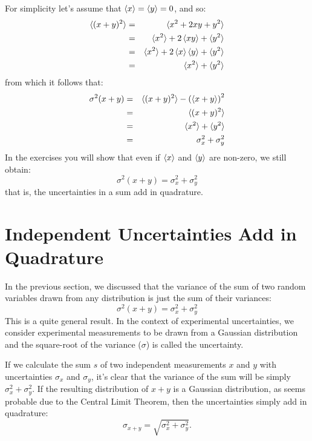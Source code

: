 \documentclass[12pt,oneside]{book}
\begin{document}
For simplicity let's assume that $\braket{x} = \braket{y} = 0$, and so:
\begin{eqnarray*}
\braket{(x + y)^2} &=& \braket{x^2 + 2xy + y^2} \\
&=& \braket{x^2} + 2\braket{xy} + \braket{y^2} \\
&=& \braket{x^2} + 2\braket{x}\braket{y} + \braket{y^2} \\
&=& \braket{x^2} + \braket{y^2} \\
\end{eqnarray*}
from which it follows that:
\begin{eqnarray*}
\sigma^2(x+y) &=& \braket{(x+y)^2} - \left( \braket{x+y} \right) ^2\\
&=& \braket{(x+y)^2}\\
&=& \braket{x^2} + \braket{y^2} \\
&=& \sigma^2_x + \sigma^2_y\\
\end{eqnarray*}
In the exercises you will show that even if $\braket{x}$ and $\braket{y}$ are non-zero, we still obtain:
\begin{displaymath}
\sigma^2(x+y) = \sigma^2_x + \sigma^2_y
\end{displaymath}
that is, the uncertainties in a sum add in quadrature.

\section{Independent Uncertainties Add in Quadrature}

In the previous section, we discussed that the variance of the sum of two random variables drawn from any distribution is just the sum of their variances:
\begin{displaymath}
\sigma^2(x+y) = \sigma^2_x + \sigma^2_y
\end{displaymath}
This is a quite general result.  In the context of experimental uncertainties, we consider experimental measurements to be drawn from a Gaussian distribution and the square-root of the variance ($\sigma$) is called the uncertainty.

If we calculate the sum $s$ of two independent measurements $x$ and $y$ with uncertainties $\sigma_x$ and $\sigma_y$, it's clear that the variance of the sum will be simply $\sigma^2_x + \sigma^2_y$.  If the resulting distribution of $x+y$ is a Gaussian distribution, as seems probable due to the Central Limit Theorem, then the uncertainties simply add in quadrature:
\begin{displaymath}
\sigma_{x+y} = \sqrt{\sigma^2_x + \sigma^2_y}.
\end{displaymath}
\end{document}
